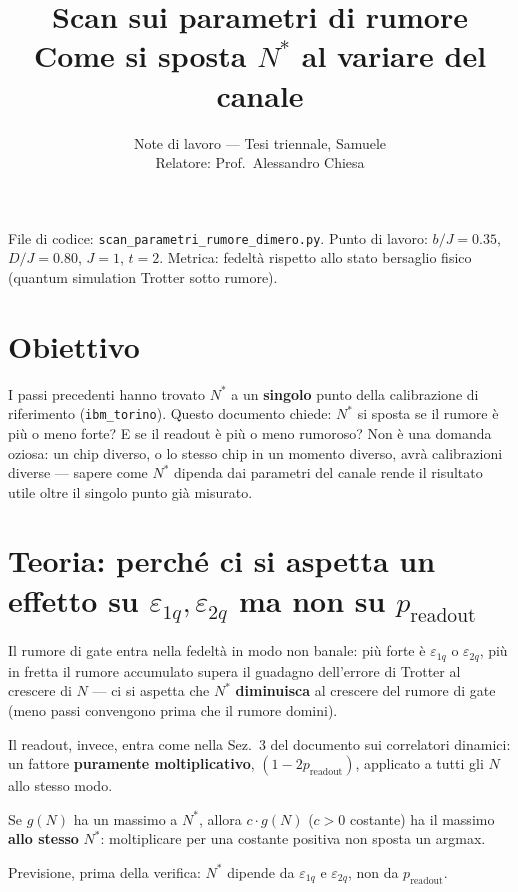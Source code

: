 \documentclass[11pt,a4paper]{article}
\title{\vspace{-1.5em}\color{inkblue}Scan sui parametri di rumore\\[0.2em]
\Large\normalfont\color{softgray}Come si sposta $N^*$ al variare del canale}
\author{Note di lavoro --- Tesi triennale, Samuele\\ Relatore: Prof.\ Alessandro Chiesa}
\date{}
\begin{document}
\sloppy
\maketitle
\thispagestyle{fancy}
\vspace{-2.0em}

File di codice: \texttt{scan\_parametri\_rumore\_dimero.py}. Punto di
lavoro: $b/J=0.35$, $D/J=0.80$, $J=1$, $t=2$. Metrica: fedeltà rispetto
allo stato bersaglio fisico (quantum simulation Trotter sotto rumore).

\tableofcontents

\section{Obiettivo}

I passi precedenti hanno trovato $N^*$ a un \textbf{singolo} punto della
calibrazione di riferimento (\texttt{ibm\_torino}). Questo documento
chiede: $N^*$ si sposta se il rumore è più o meno forte? E se il
readout è più o meno rumoroso? Non è una domanda oziosa: un chip diverso,
o lo stesso chip in un momento diverso, avrà calibrazioni diverse ---
sapere come $N^*$ dipenda dai parametri del canale rende il risultato
utile oltre il singolo punto già misurato.

\section{Teoria: perché ci si aspetta un effetto su \texorpdfstring{$\varepsilon_{1q},\varepsilon_{2q}$}{eps} ma non su \texorpdfstring{$p_\text{readout}$}{p readout}}

Il rumore di gate entra nella fedeltà in modo non banale: più forte è
$\varepsilon_{1q}$ o $\varepsilon_{2q}$, più in fretta il rumore
accumulato supera il guadagno dell'errore di Trotter al crescere di $N$
--- ci si aspetta che $N^*$ \textbf{diminuisca} al crescere del rumore di
gate (meno passi convengono prima che il rumore domini).

Il readout, invece, entra come nella Sez.~3 del documento sui correlatori
dinamici: un fattore \textbf{puramente moltiplicativo},
$(1-2p_\text{readout})$, applicato a tutti gli $N$ allo stesso modo.
\begin{keyeq}
\centering
Se $g(N)$ ha un massimo a $N^*$, allora $c\cdot g(N)$ ($c>0$ costante)
ha il massimo \textbf{allo stesso} $N^*$: moltiplicare per una costante
positiva non sposta un argmax.
\end{keyeq}
Previsione, prima della verifica: $N^*$ dipende da $\varepsilon_{1q}$ e
$\varepsilon_{2q}$, non da $p_\text{readout}$.
\end{document}
